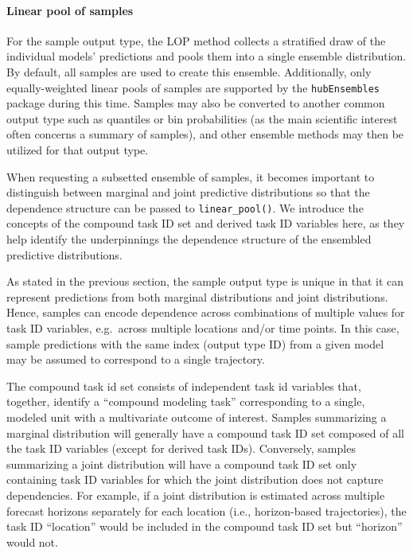 \documentclass[
]{article}
\let\oldparagraph\paragraph
\renewcommand{\paragraph}[1]{\oldparagraph{#1}\mbox{}}
\begin{document}
\paragraph{Linear pool of samples}\label{linear-pool-of-samples}

For the sample output type, the LOP method collects a stratified draw of
the individual models' predictions and pools them into a single ensemble
distribution. By default, all samples are used to create this ensemble.
Additionally, only equally-weighted linear pools of samples are
supported by the \texttt{hubEnsembles} package during this time. Samples
may also be converted to another common output type such as quantiles or
bin probabilities (as the main scientific interest often concerns a
summary of samples), and other ensemble methods may then be utilized for
that output type.

When requesting a subsetted ensemble of samples, it becomes important to
distinguish between marginal and joint predictive distributions so that
the dependence structure can be passed to \texttt{linear\_pool()}. We
introduce the concepts of the compound task ID set and derived task ID
variables here, as they help identify the underpinnings the dependence
structure of the ensembled predictive distributions.

As stated in the previous section, the sample output type is unique in
that it can represent predictions from both marginal distributions and
joint distributions. Hence, samples can encode dependence across
combinations of multiple values for task ID variables, e.g.~across
multiple locations and/or time points. In this case, sample predictions
with the same index (output type ID) from a given model may be assumed
to correspond to a single trajectory.

The compound task id set consists of independent task id variables that,
together, identify a ``compound modeling task'' corresponding to a
single, modeled unit with a multivariate outcome of interest. Samples
summarizing a marginal distribution will generally have a compound task
ID set composed of all the task ID variables (except for derived task
IDs). Conversely, samples summarizing a joint distribution will have a
compound task ID set only containing task ID variables for which the
joint distribution does not capture dependencies. For example, if a
joint distribution is estimated across multiple forecast horizons
separately for each location (i.e., horizon-based trajectories), the
task ID ``location'' would be included in the compound task ID set but
``horizon'' would not.
\end{document}
